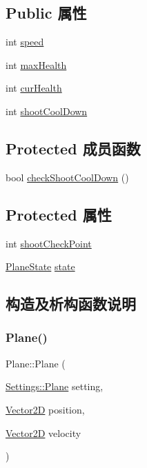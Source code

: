 \subsection*{Public 属性}
\begin{DoxyCompactItemize}
\item 
int \hyperlink{class_plane_a6ca15b26a453dfd4f81fa11a5ee278c9}{speed}
\item 
int \hyperlink{class_plane_ac39ded6721a8137c4a8044adfbfb8a6c}{max\+Health}
\item 
int \hyperlink{class_plane_a0434f35fe3f56acb865e51c042e43df8}{cur\+Health}
\item 
int \hyperlink{class_plane_ae9f4ab92b0aa75cff1f14df37980eabd}{shoot\+Cool\+Down}
\end{DoxyCompactItemize}
\subsection*{Protected 成员函数}
\begin{DoxyCompactItemize}
\item 
bool \hyperlink{class_plane_a77bd3df33921e215669be6583619ee45}{check\+Shoot\+Cool\+Down} ()
\end{DoxyCompactItemize}
\subsection*{Protected 属性}
\begin{DoxyCompactItemize}
\item 
int \hyperlink{class_plane_a36cb09c56fbf7b8c28506d8dd70f07cb}{shoot\+Check\+Point}
\item 
\hyperlink{_plane_01-_01_bullet_8h_a9f852e2715e13ec145d551659d2813bc}{Plane\+State} \hyperlink{class_plane_a30babe177abbe22e61d2cc274945f3fc}{state}
\end{DoxyCompactItemize}


\subsection{构造及析构函数说明}
\mbox{\label{class_plane_ab0729538ddb380ca9a5b501f4cf72714}} 
\subsubsection{\texorpdfstring{Plane()}{Plane()}}
{\footnotesize\ttfamily Plane\+::\+Plane (\begin{DoxyParamCaption}\item[{\hyperlink{struct_settings_1_1_plane}{Settings\+::\+Plane}}]{setting,  }\item[{\hyperlink{_vector2_d_8hpp_aa1f1145650f1dd9bddf7335ec6434d7c}{Vector2D}}]{position,  }\item[{\hyperlink{_vector2_d_8hpp_aa1f1145650f1dd9bddf7335ec6434d7c}{Vector2D}}]{velocity }\end{DoxyParamCaption})}


